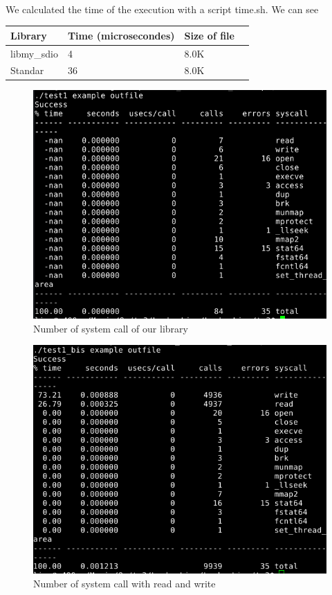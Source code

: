 \documentclass[a4paper,10pt]{article}
\begin{document}
\paragraph{}
We calculated the time of the execution with a script time.sh. We can see

\begin{tabular}{|R{2cm}|C{2cm}|L{1.5cm}|L{1.5cm}|}
\hline {}Library & Time (microsecondes) & Size of file\\
\hline  libmy\_sdio & 4 & 8.0K \\
\hline  Standar  & 36 & 8.0K \\
\hline 
\end{tabular}

\begin{figure}[ht]
\center 
\includegraphics[width=0.85\linewidth]{my_strace.png}
\caption{Number of system call of our library}
\label{first}
\end{figure}
\begin{figure}[ht]
\center 
\includegraphics[width=0.85\linewidth]{syscall_strace.png}
\caption{Number of system call with read and write}
\label{worst}
\end{figure}
\begin{figure}[ht]
\center 

\label{best}
\end{figure}
\end{document}
